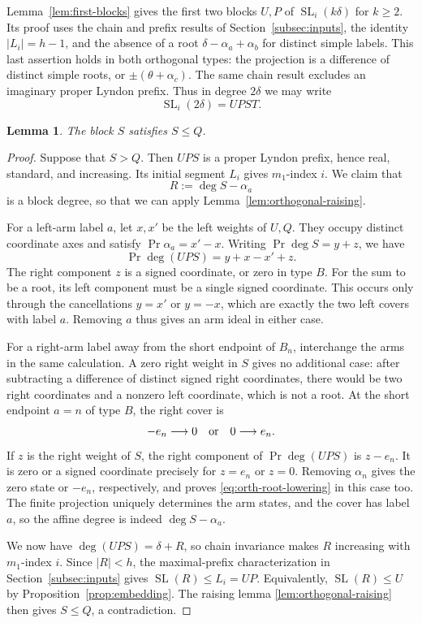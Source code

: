 \documentclass[11pt]{amsart}
\numberwithin{equation}{section}
\newtheorem{lemma}[theorem]{Lemma}
\theoremstyle{definition}
\DeclareMathOperator{\SL}{SL}
\DeclareMathOperator{\Prj}{Pr}
\begin{document}
Lemma~\ref{lem:first-blocks} gives the first two blocks $U,P$ of $\SL_i(k\delta)$ for $k\geq2$. Its proof uses the chain and prefix results of Section~\ref{subsec:inputs}, the identity $|L_i|=h-1$, and the absence of a root $\delta-\alpha_a+\alpha_b$ for distinct simple labels. This last assertion holds in both orthogonal types: the projection is a difference of distinct simple roots, or $\pm(\theta+\alpha_c)$. The same chain result excludes an imaginary proper Lyndon prefix. Thus in degree $2\delta$ we may write
\[
 \SL_i(2\delta)=UPST.
\]

\begin{lemma}\label{lem:orthogonal-third}
The block $S$ satisfies $S\leq Q$.
\end{lemma}
\begin{proof}
Suppose that $S>Q$. Then $UPS$ is a proper Lyndon prefix, hence real, standard, and increasing. Its initial segment $L_i$ gives $m_1$-index $i$. We claim that
\begin{equation}\label{eq:orth-root-lowering}
 R:=\deg S-\alpha_a
\end{equation}
is a block degree, so that we can apply Lemma~\ref{lem:orthogonal-raising}.

For a left-arm label $a$, let $x,x'$ be the left weights of $U,Q$. They occupy distinct coordinate axes and satisfy $\Prj\alpha_a=x'-x$. Writing $\Prj\deg S=y+z$, we have
\[
 \Prj\deg(UPS)=y+x-x'+z.
\]
The right component $z$ is a signed coordinate, or zero in type $B$. For the sum to be a root, its left component must be a single signed coordinate. This occurs only through the cancellations $y=x'$ or $y=-x$, which are exactly the two left covers with label $a$. Removing $a$ thus gives an arm ideal in either case.

For a right-arm label away from the short endpoint of $B_n$, interchange the arms in the same calculation. A zero right weight in $S$ gives no additional case: after subtracting a difference of distinct signed right coordinates, there would be two right coordinates and a nonzero left coordinate, which is not a root. At the short endpoint $a=n$ of type $B$, the right cover is
\[
 -e_n\longrightarrow0\quad\hbox{or}\quad0\longrightarrow e_n.
\]
If $z$ is the right weight of $S$, the right component of $\Prj\deg(UPS)$ is $z-e_n$. It is zero or a signed coordinate precisely for $z=e_n$ or $z=0$. Removing $\alpha_n$ gives the zero state or $-e_n$, respectively, and proves \eqref{eq:orth-root-lowering} in this case too. The finite projection uniquely determines the arm states, and the cover has label $a$, so the affine degree is indeed $\deg S-\alpha_a$.

We now have $\deg(UPS)=\delta+R$, so chain invariance makes $R$ increasing with $m_1$-index $i$. Since $|R|<h$, the maximal-prefix characterization in Section~\ref{subsec:inputs} gives $\SL(R)\leq L_i=UP$. Equivalently, $\SL(R)\leq U$ by Proposition~\ref{prop:embedding}. The raising lemma \ref{lem:orthogonal-raising} then gives $S\leq Q$, a contradiction.
\end{proof}
\end{document}
